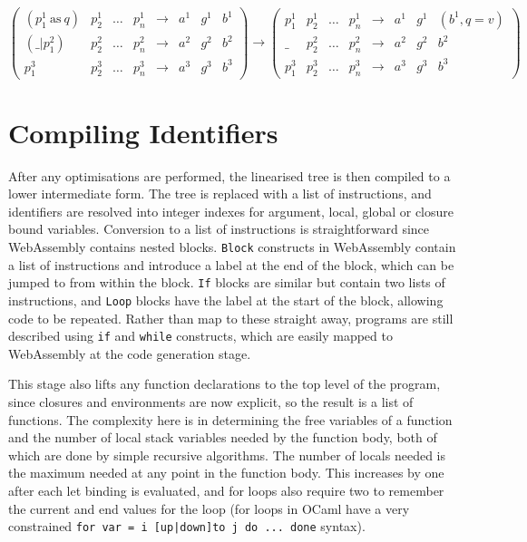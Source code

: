 $
\begin{pmatrix}
(p^1_1\ \mathrm{as}\ q) & p^1_2 & \dots & p^1_n & \to & a^1 & g^1 & b^1 \\
(\_ | p^2_1) & p^2_2 & \dots & p^2_n & \to & a^2 & g^2 & b^2 \\
p^3_1 & p^3_2 & \dots & p^3_n & \to & a^3 & g^3 & b^3
\end{pmatrix}
\to
\begin{pmatrix}
 p^1_1 & p^1_2 & \dots & p^1_n  & \to & a^1 & g^1 & (b^1, q=v) \\
\_ & p^2_2 & \dots & p^2_n  & \to & a^2 & g^2 & b^2 \\
p^3_1 & p^3_2 & \dots & p^3_n  & \to & a^3 & g^3 & b^3
\end{pmatrix}
$



\section{Compiling Identifiers}
After any optimisations are performed, the linearised tree is then compiled to a lower intermediate form. The tree is replaced with a list of instructions, and identifiers are resolved into integer indexes for argument, local, global or closure bound variables. 
Conversion to a list of instructions is straightforward since WebAssembly contains nested blocks. \verb|Block| constructs in WebAssembly contain a list of instructions and introduce a label at the end of the block, which can be jumped to from within the block. \verb|If| blocks are similar but contain two lists of instructions, and \verb|Loop| blocks have the label at the start of the block, allowing code to be repeated. 
Rather than map to these straight away, programs are still described using \verb|if| and \verb|while| constructs, which are easily mapped to WebAssembly at the code generation stage. %

This stage also lifts any function declarations to the top level of the program, since closures and environments are now explicit, so the result is a list of functions. The complexity here is in determining the free variables of a function and the number of local stack variables needed by the function body, both of which are done by simple recursive algorithms. The number of locals needed is the maximum needed at any point in the function body. This increases by one after each let binding is evaluated, and for loops also require two to remember the current and end values for the loop (for loops in OCaml have a very constrained \verb"for var = i [up|down]to j do ... done" syntax). 

